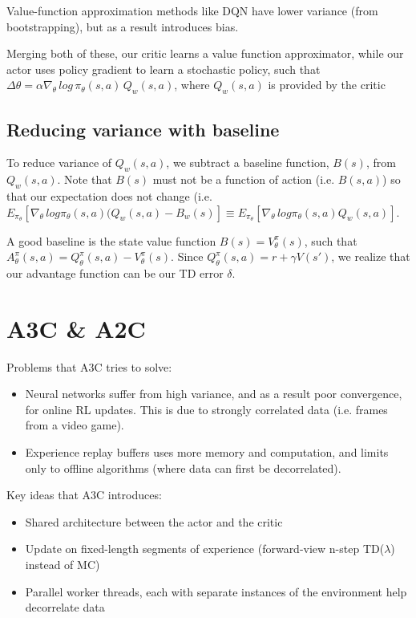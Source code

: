 \documentclass[12pt]{article} %
\begin{document}
Value-function approximation methods like DQN have lower variance (from bootstrapping), but as a result introduces bias.

Merging both of these, our critic learns a value function approximator, while our actor uses policy gradient to learn a stochastic policy, such that $\Delta\theta = \alpha \nabla_\theta\, log\, \pi_\theta (s,a)\, Q_w(s,a)$, where $Q_w(s,a)$ is provided by the critic
\subsection{Reducing variance with baseline}
To reduce variance of $Q_w(s,a)$, we subtract a baseline function, $B(s)$, from $Q_w(s,a)$. Note that $B(s)$ must not be a function of action (i.e. $B(s,a)$) so that our expectation does not change (i.e. $E_{\pi_\theta}[\nabla_\theta\,log\pi_\theta(s,a)(Q_w(s,a)-B_w(s)] \equiv E_{\pi_\theta}[\nabla_\theta\,log\pi_\theta(s,a)Q_w(s,a)]$.

A good baseline is the state value function $B(s)=V^\pi_\theta(s)$, such that $A^\pi_\theta(s,a) = Q^\pi_\theta(s,a) - V^\pi_\theta(s)$. Since $Q^\pi_\theta(s,a)=r+\gamma V(s')$, we realize that our advantage function can be our TD error $\delta$.

\section{A3C \& A2C}
Problems that A3C tries to solve:
\begin{itemize}
    \item Neural networks suffer from high variance, and as a result poor convergence, for online RL updates. This is due to strongly correlated data (i.e. frames from a video game).
    \item Experience replay buffers uses more memory and computation, and limits only to offline algorithms (where data can first be decorrelated).
\end{itemize}
Key ideas that A3C introduces:
\begin{itemize}
    \item Shared architecture between the actor and the critic
    \item Update on fixed-length segments of experience (forward-view n-step TD($\lambda$) instead of MC)
    \item Parallel worker threads, each with separate instances of the environment help decorrelate data
\end{itemize}
\end{document}
